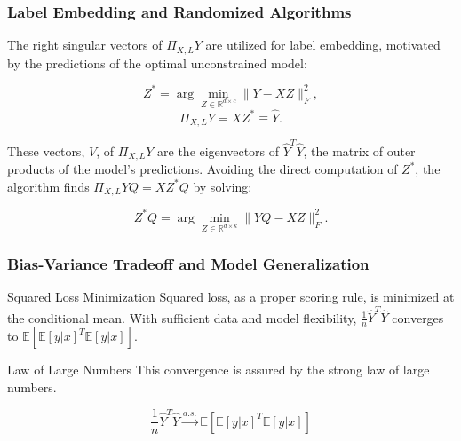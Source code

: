 \documentclass{beamer}
\begin{document}




\begin{frame}
\frametitle{Label Embedding and Randomized Algorithms}
The right singular vectors of \( \Pi_{X,L}Y \) are utilized for label embedding, motivated by the predictions of the optimal unconstrained model:

\[ Z^* = \arg\min_{Z \in \mathbb{R}^{d \times c}} \|Y - XZ\|_F^2, \]
\[ \Pi_{X,L}Y = XZ^* \equiv \hat{Y}. \]

These vectors, \( V \), of \( \Pi_{X,L}Y \) are the eigenvectors of \( \hat{Y}^T\hat{Y} \), the matrix of outer products of the model's predictions. Avoiding the direct computation of \( Z^* \), the algorithm finds \( \Pi_{X,L}YQ = XZ^*Q \) by solving:

\[ Z^*Q = \arg\min_{Z \in \mathbb{R}^{d \times k}} \|YQ - XZ\|_F^2. \]
\end{frame}


\begin{frame}
\frametitle{Bias-Variance Tradeoff and Model Generalization}
\begin{block}{Squared Loss Minimization}
Squared loss, as a proper scoring rule, is minimized at the conditional mean. With sufficient data and model flexibility, \( \frac{1}{n} \hat{Y}^T\hat{Y} \) converges to \( \mathbb{E}[\mathbb{E}[y|x]^T \mathbb{E}[y|x]] \).
\end{block}
\begin{block}{Law of Large Numbers}
This convergence is assured by the strong law of large numbers.
\end{block}
\begin{equation}
    \frac{1}{n} \hat{Y}^T\hat{Y} \xrightarrow{a.s.} \mathbb{E}[\mathbb{E}[y|x]^T \mathbb{E}[y|x]]
\end{equation}
\end{frame}
\end{document}
